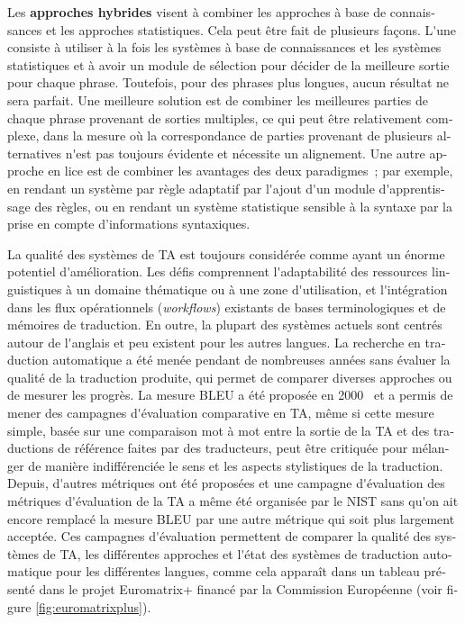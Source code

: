 \begin{french}
\begin{multicols}{2}
Les {\bf approches hybrides} visent à combiner les approches à base de
connaissances et les approches statistiques. Cela peut être fait de
plusieurs façons. L{\mbox '}une consiste à utiliser à la fois les
systèmes à base de connaissances et les systèmes statistiques et à
avoir un module de sélection pour décider de la meilleure sortie pour
chaque phrase. Toutefois, pour des phrases plus longues, aucun
résultat ne sera parfait. Une meilleure solution est de combiner les
meilleures parties de chaque phrase provenant de sorties multiples, ce
qui peut être relativement complexe, dans la mesure où la
correspondance de parties provenant de plusieurs alternatives n{\mbox
  '}est pas toujours évidente et nécessite un alignement. Une autre
approche en lice est de combiner les avantages des deux paradigmes~;
par exemple, en rendant un système par règle adaptatif par l{\mbox
  '}ajout d{\mbox '}un module d{\mbox '}apprentissage des règles, ou
en rendant un système statistique sensible à la syntaxe par la prise
en compte d'informations syntaxiques.

La qualité des systèmes de TA est toujours considérée comme ayant un
énorme potentiel d{\mbox '}amélioration. Les défis comprennent l{\mbox '}adaptabilité
des ressources linguistiques à un domaine thématique ou à une zone
d{\mbox '}utilisation, et l{\mbox '}intégration dans les flux opérationnels ({\em workflows}) existants de bases
terminologiques et de mémoires de traduction. En outre, la plupart des
systèmes actuels sont centrés autour de l{\mbox '}anglais et peu existent pour
les autres langues. La recherche en traduction automatique a été menée
pendant de nombreuses années sans évaluer la qualité de la traduction
produite, qui permet de comparer diverses approches ou de mesurer les
progrès. La mesure BLEU a été proposée en 2000~\cite{bleu02} et a permis de mener
des campagnes d{\mbox '}évaluation comparative en TA, même si cette mesure
simple, basée sur une comparaison mot à mot entre la sortie de la
TA et des traductions de référence faites par des
traducteurs, peut être critiquée pour mélanger de manière
indifférenciée le sens et les aspects stylistiques de la
traduction. Depuis, d{\mbox '}autres métriques ont été proposées et une
campagne d{\mbox '}évaluation des métriques d{\mbox '}évaluation de la TA a même été
organisée par le NIST sans qu{\mbox '}on ait encore remplacé la mesure BLEU
par une autre métrique qui soit plus largement acceptée. Ces campagnes
d{\mbox '}évaluation permettent de comparer la qualité des systèmes de TA, les
différentes approches et l{\mbox '}état des systèmes de traduction automatique pour les
différentes langues, comme cela apparaît dans un tableau présenté dans
le projet Euromatrix+ financé par la Commission Européenne (voir figure \ref{fig:euromatrixplus}).




\end{multicols}
\end{french}
